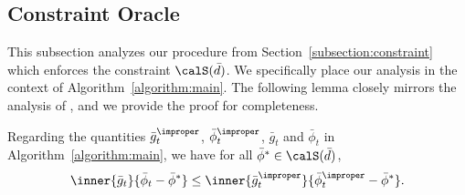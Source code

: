 \documentclass[10pt]{article}
\begin{document}
\subsection{Constraint Oracle}

This subsection analyzes our procedure from Section~\ref{subsection:constraint} which enforces the constraint $\calS(\bar d)$. We specifically place our analysis in the context of Algorithm~\ref{algorithm:main}. The following lemma closely mirrors the analysis of \citep{luo2015achieving,orabona2016coin}, and we provide the proof for completeness.

\begin{lemma}\label{lemma:regret_wrapper}
Regarding the quantities $\bar g_t^\improper$, $\bar \phi_t^\improper$, $\bar g_t$ and $\bar\phi_t$ in Algorithm~\ref{algorithm:main}, we have for all $\bar\phi^*\in\calS(\bar d)$,
\begin{equation*}
\inner{\bar g_t}{\bar \phi_t-\bar \phi^*}\leq \inner{\bar g_t^\improper}{\bar \phi_t^\improper-\bar \phi^*}.
\end{equation*}
\end{lemma}
\end{document}
